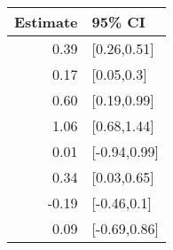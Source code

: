 \begin{tabular}{rl}
  \hline
Estimate & 95\% CI \\ 
  \hline
0.39 & [0.26,0.51] \\ 
  0.17 & [0.05,0.3] \\ 
  0.60 & [0.19,0.99] \\ 
  1.06 & [0.68,1.44] \\ 
  0.01 & [-0.94,0.99] \\ 
  0.34 & [0.03,0.65] \\ 
  -0.19 & [-0.46,0.1] \\ 
  0.09 & [-0.69,0.86] \\ 
   \hline
\end{tabular}

